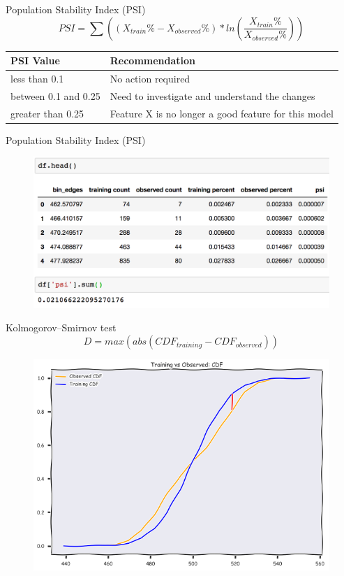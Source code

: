 \documentclass{beamer}
\begin{document}
\begin{frame}{Population Stability Index (PSI)}
	$$PSI=\sum((X_{train}\% - X_{observed}\%)*ln(\frac{X_{train}\%}{X_{observed}\%}))$$
	\begin{table}[ht]
	\centering
	\begin{adjustbox}{width=\textwidth}
		\begin{tabular}{|l|l|}
		\hline
		\textbf{PSI Value} & \textbf{Recommendation} \\
		\hline
		less than 0.1 & No action required \\
		\hline
		between 0.1 and 0.25 & Need to investigate and understand the changes \\
		\hline
		greater than 0.25 & Feature X is no longer a good feature for this model \\
		\hline
		\end{tabular}
	\end{adjustbox}
	\end{table}

\end{frame}

\begin{frame}{Population Stability Index (PSI)}
	\begin{figure}
		\centering
		\includegraphics[width=0.8\linewidth]{psi_calc.png}
	\end{figure}
\end{frame}


\begin{frame}{Kolmogorov–Smirnov test}
	$$D=max(abs(CDF_{training} - CDF_{observed}))$$
	\begin{figure}
		\centering
		\includegraphics[width=0.6\linewidth]{two_dist_cdf.png}
	\end{figure}
\end{frame}
\end{document}
